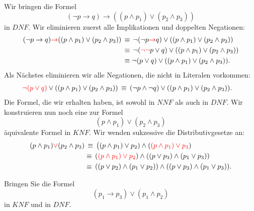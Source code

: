 \begin{bsp}
Wir bringen die Formel
\[
(\neg p\to q)\to ((p\land p_1)\lor(p_2\land p_3))
\]
in $DNF$. Wir eliminieren zuerst alle Implikationen und doppelten Negationen:
\begin{align*}
(\neg p\to q)\textcolor{red}{\to} ((p\land p_1)\lor(p_2\land p_3))\,&\equiv\, \neg(\neg p\textcolor{red}{\to} q)\lor ((p\land p_1)\lor(p_2\land p_3))\\
&\equiv\, \neg(\textcolor{red}{\neg\neg} p \lor q)\lor ((p\land p_1)\lor(p_2\land p_3))\\
&\equiv \neg(p \lor q)\lor ((p\land p_1)\lor(p_2\land p_3)).
\end{align*}
Als Nächstes eliminieren wir alle Negationen, die nicht in Literalen vorkommen:
\begin{align*}
\textcolor{red}{\neg(p \lor q)}\lor ((p\land p_1)\lor(p_2\land p_3))\,&\equiv\,(\neg p\land\neg q)\lor ((p\land p_1)\lor(p_2\land p_3)).
\end{align*}
Die Formel, die wir erhalten haben, ist sowohl in $NNF$ als auch in $DNF$. Wir konstruieren nun noch eine zur Formel
\[
(p\land p_1)\lor(p_2\land p_3)
\]
äquivalente Formel in $KNF$. Wir wenden sukzessive die Distributivgesetze an:
\begin{align*}
(p\land p_1)\textcolor{red}{\lor}(p_2\land p_3)&\,\equiv\,\big( (p\land p_1)\lor p_2)\land (\textcolor{red}{(p\land p_1)\lor p_3})\\
&\equiv\, (\textcolor{red}{(p\land p_1)\lor p_2})\land ((p\lor p_3)\land(p_1\lor p_3))\\
&\equiv\, ((p\lor p_2)\land(p_1\lor p_2))\land ((p\lor p_3)\land(p_1\lor p_3)).
\end{align*}
\end{bsp}

\begin{ueb}
Bringen Sie die Formel
\[
(p_1\to p_3)\lor(p_1\land p_2)
\]
in $KNF$ und in $DNF$.
\end{ueb}
\begin{lsg}
\end{lsg}

